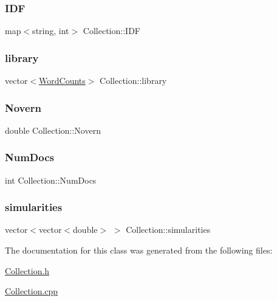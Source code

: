 \subsubsection{\texorpdfstring{I\+DF}{IDF}}
{\footnotesize\ttfamily map$<$string, int$>$ Collection\+::\+I\+DF\hspace{0.3cm}{\ttfamily [protected]}}

\mbox{\label{class_collection_a33713580ff78f8b306b243a552609a3d}} 
\subsubsection{\texorpdfstring{library}{library}}
{\footnotesize\ttfamily vector$<$\hyperlink{class_word_counts}{Word\+Counts}$>$ Collection\+::library\hspace{0.3cm}{\ttfamily [protected]}}

\mbox{\label{class_collection_aad698dbd68dbc0031eceadf885bac9ee}} 
\subsubsection{\texorpdfstring{Novern}{Novern}}
{\footnotesize\ttfamily double Collection\+::\+Novern\hspace{0.3cm}{\ttfamily [protected]}}

\mbox{\label{class_collection_ad1eac1bd661969e31c8b195e1efc1051}} 
\subsubsection{\texorpdfstring{Num\+Docs}{NumDocs}}
{\footnotesize\ttfamily int Collection\+::\+Num\+Docs\hspace{0.3cm}{\ttfamily [protected]}}

\mbox{\label{class_collection_ae47083f6b3d9bc58d31455855e1f0673}} 
\subsubsection{\texorpdfstring{simularities}{simularities}}
{\footnotesize\ttfamily vector$<$vector$<$double$>$ $>$ Collection\+::simularities\hspace{0.3cm}{\ttfamily [protected]}}



The documentation for this class was generated from the following files\+:\begin{DoxyCompactItemize}
\item 
\hyperlink{_collection_8h}{Collection.\+h}\item 
\hyperlink{_collection_8cpp}{Collection.\+cpp}\end{DoxyCompactItemize}
